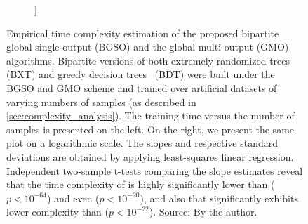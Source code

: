 \begin{figure}[tb]
\begin{subfigure}{0.49\textwidth}
{        ]}
    \end{subfigure}
    \caption{
        Empirical time complexity estimation of the proposed bipartite global single-output (BGSO) and the global multi-output (GMO)~\cite{pliakos2018global}
        algorithms. Bipartite versions of both extremely randomized trees~\cite{geurts2006extremely} (BXT) and greedy decision trees~\cite{breiman1984classification} (BDT) were built under the BGSO and GMO scheme and trained over artificial datasets of varying numbers of samples (as described in \autoref{sec:complexity_analysis}). The training time versus the number of samples is presented on the left. On the right, we present the same plot on a logarithmic scale. The slopes and respective standard deviations are obtained by applying least-squares linear regression.
        Independent two-sample t-tests comparing the slope estimates reveal that the time complexity of  is highly significantly lower than  ($p < 10^{-64}$) and even  ($p < 10^{-20}$), and also that  significantly exhibits lower complexity than  ($p < 10^{-22}$).
        \newline Source: By the author.
    }
    \label{fig:empirical_complexity}
\end{figure}


